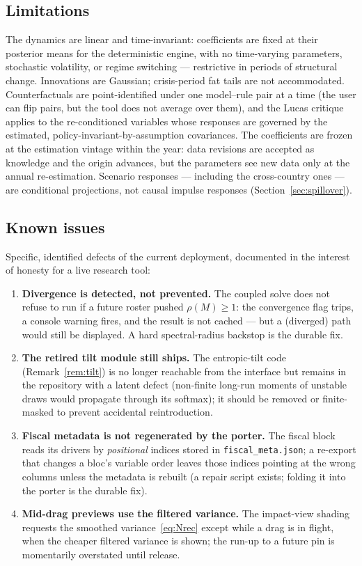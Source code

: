 \documentclass[11pt]{article}
\theoremstyle{plain}
\theoremstyle{remark}
\begin{document}
\subsection{Limitations}\label{sec:limits}

The dynamics are linear and time-invariant: coefficients are fixed at
their posterior means for the deterministic engine, with no time-varying
parameters, stochastic volatility, or regime switching --- restrictive
in periods of structural change. Innovations are Gaussian; crisis-period
fat tails are not accommodated. Counterfactuals are point-identified
under one model--rule pair at a time (the user can flip pairs, but the
tool does not average over them), and the Lucas critique applies to the
re-conditioned variables whose responses are governed by the estimated,
policy-invariant-by-assumption covariances. The coefficients are frozen
at the estimation vintage within the year: data revisions are accepted
as knowledge and the origin advances, but the parameters see new data
only at the annual re-estimation. Scenario responses --- including the
cross-country ones --- are conditional projections, not causal impulse
responses (Section~\ref{sec:spillover}).

\subsection{Known issues}\label{sec:knownissues}

Specific, identified defects of the current deployment, documented in
the interest of honesty for a live research tool:
\begin{enumerate}
  \item \textbf{Divergence is detected, not prevented.} The coupled
    solve does not refuse to run if a future roster pushed
    $\rho(M) \ge 1$: the convergence flag trips, a console warning
    fires, and the result is not cached --- but a (diverged) path would
    still be displayed. A hard spectral-radius backstop is the durable
    fix.
  \item \textbf{The retired tilt module still ships.} The entropic-tilt
    code (Remark~\ref{rem:tilt}) is no longer reachable from the
    interface but remains in the repository with a latent defect
    (non-finite long-run moments of unstable draws would propagate
    through its softmax); it should be removed or finite-masked to
    prevent accidental reintroduction.
  \item \textbf{Fiscal metadata is not regenerated by the porter.} The
    fiscal block reads its drivers by \emph{positional} indices stored
    in \texttt{fiscal\_meta.json}; a re-export that changes a bloc's
    variable order leaves those indices pointing at the wrong columns
    unless the metadata is rebuilt (a repair script exists; folding it
    into the porter is the durable fix).
  \item \textbf{Mid-drag previews use the filtered variance.} The
    impact-view shading requests the smoothed
    variance~\eqref{eq:Nrec} except while a drag is in flight, when the
    cheaper filtered variance is shown; the run-up to a future pin is
    momentarily overstated until release.
\end{enumerate}
\end{document}
